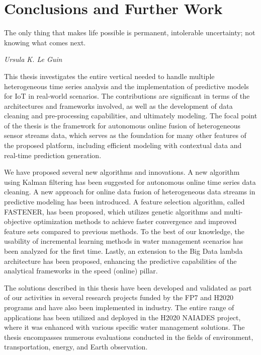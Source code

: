 % 
\chapter{Conclusions and Further Work}
\label{ch:conclusion}

\epigraph{The only thing that makes life possible is permanent, intolerable uncertainty; not knowing what comes next.}{\textit{Ursula K. Le Guin}}

This thesis investigates the entire vertical needed to handle multiple heterogeneous time series analysis and the implementation of predictive models for IoT in real-world scenarios.
The contributions are significant in terms of the architectures and frameworks involved, as well as the development of data cleaning and pre-processing capabilities, and ultimately modeling. 
The focal point of the thesis is the framework for autonomous online fusion of heterogeneous sensor streams data, which serves as the foundation for many other features of the proposed platform, including efficient modeling with contextual data and real-time prediction generation.

We have proposed several new algorithms and innovations.
A new algorithm using Kalman filtering has been suggested for autonomous online time series data cleaning. 
A new approach for online data fusion of heterogeneous data streams in predictive modeling has been introduced. 
A feature selection algorithm, called FASTENER, has been proposed, which utilizes genetic algorithms and multi-objective optimization methods to achieve faster convergence and improved feature sets compared to previous methods.
To the best of our knowledge, the usability of incremental learning methods in water management scenarios has been analyzed for the first time. 
Lastly, an extension to the Big Data lambda architecture has been proposed, enhancing the predictive capabilities of the analytical frameworks in the speed (online) pillar.

The solutions described in this thesis have been developed and validated as part of our activities in several research projects funded by the FP7 and H2020 programs and have also been implemented in industry. 
The entire range of applications has been utilized and deployed in the H2020 NAIADES project, where it was enhanced with various specific water management solutions. 
The thesis encompasses numerous evaluations conducted in the fields of environment, transportation, energy, and Earth observation.

